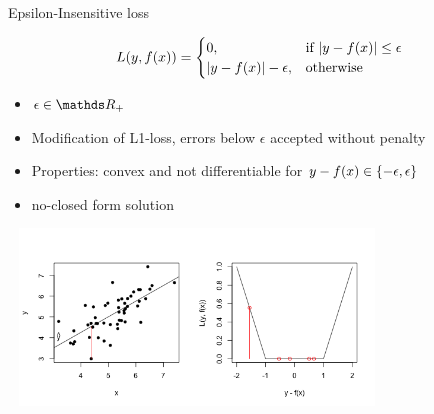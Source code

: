 \begin{vbframe}{Epsilon-Insensitive loss}

\vspace*{-0.3cm}
$$
L(y, f(x)) =  \begin{cases}
  0,  & \text{if } |y - f(x)| \le \epsilon \\
  |y - f(x)|-\epsilon, & \text{otherwise }
  \end{cases}
$$
\vspace*{-0.3cm}
\begin{itemize}
\item $ \epsilon \in \R_{+}$
\item Modification of L1-loss, errors below $\epsilon$ accepted without penalty
\item Properties: convex and not differentiable for $ y - f(x) \in \{-\epsilon, \epsilon\}$
\item no-closed form solution
\end{itemize}

\vspace*{-1.1cm}

\begin{center}
\includegraphics[width = 10cm, height = 4.7cm]{figure_man/2_6_loss_epsilon_plot1.png} \\
\end{center}

\end{vbframe}


